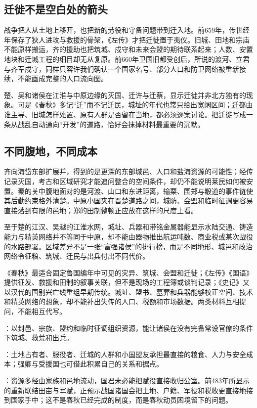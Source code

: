 \subsection{迁徙不是空白处的箭头}

战争把人从土地上移开，也把新的劳役和守备问题带到迁入地。前659年，传世经年保存了狄人进攻与救援的骨架，《左传》才把迁徙置于夷仪。旧城、田地和宗庙不能原样搬运，齐的援助也把筑城、戍守和未来会盟的期待联系起来；人数、安置地块和迁城工程的细目却无从复原。前660年卫国旧都受创后，所说的渡河、立君与齐军戍守，同样只容许我们确认一个国家名号、部分人口和防卫网络被重新接续，不能画成完整的人口流向图。

楚、吴和诸侯在江淮与中原边缘的灭国、迁许与迁蔡，显示迁徙并非北方独有的现象。可是《春秋》多记“迁”而不记迁民，城址的年代也常只给出宽阔区间；迁都由谁主导、旧城怎样处置、原有人群是否留在当地，都必须逐案讨论。把迁徙写成一条从战乱自动通向“开发”的道路，恰好会抹掉材料最重要的沉默。

\subsection{不同腹地，不同成本}

齐向海岱东部扩展并，得到的是更深的东部城邑、人口和盐海资源的可能性；经传记录灭国，考古和区域研究才能追问整合的空间条件，却仍不能说明莱民如何被安置。秦的关中腹地面对的是河渡、山口和东进距离，输粟、围郑与殽道的事件链使其后勤约束格外清楚。中原小国夹在晋楚道路之间，城防、会盟和临时征调更容易直接落到有限的邑地；郑的田制整顿正应放在这样的尺度上看。

至于楚的江汉、吴越的江淮水网，城址、兵器和带铭金属器能显示水陆交通、铸造能力与精英网络并不等同于中原，却不能由器物推出航运吨数、商业税或某次战役的水路部署。区域差异不是一张“富强诸侯”的排行榜，而是不同地形、城邑和政治网络令征粮、筑城、迁民与出兵付出不同代价。

\begin{sourcenote}[文本的账与考古的尺度]
《春秋》最适合固定鲁国编年中可见的灾异、筑城、会盟和迁徙；《左传》《国语》提供征发、救援和田制的叙事关联，但不是现场的工程簿或谈判记录；《史记》又以汉代的国别兴亡线重组早期传统。城址、盟书、墓葬和兵器能够校正空间、技术和精英网络的想象，却不能补出失传的人口、税额和市场数据。两类材料互相提问，不能相互代写。
\end{sourcenote}

\begin{turningpoint}[从春秋社会到战国国家]
：以封邑、宗族、盟约和临时征调组织资源，能让诸侯在没有完备常设官僚的条件下筑城、救荒和出兵。

：土地占有者、服役者、迁城的人群和小国盟友承担最直接的粮食、人力与安全成本；强卿与受援国也可借此积累自己的关系和据点。

：资源多经由家族和邑地流动，国君未必能把赋役直接收归公室。前483年所显示的重新联结田亩与军赋，正预示战国诸国会把土地、户籍、军役和税收更直接地接到国家手中；这不是春秋已经完成的制度，而是春秋动员困境留下的问题。
\end{turningpoint}

